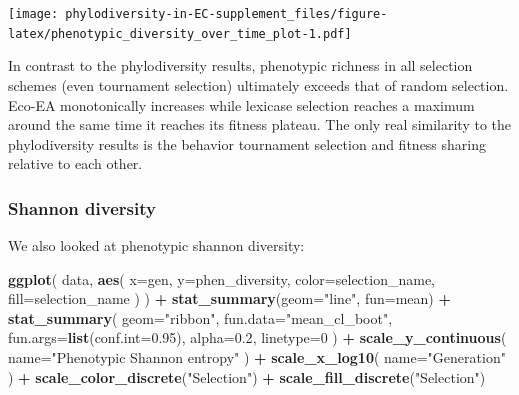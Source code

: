\documentclass[]{book}
\newenvironment{Shaded}{\begin{snugshade}}{\end{snugshade}}
\newcommand{\DataTypeTok}[1]{\textcolor[rgb]{0.13,0.29,0.53}{#1}}
\newcommand{\DecValTok}[1]{\textcolor[rgb]{0.00,0.00,0.81}{#1}}
\newcommand{\FloatTok}[1]{\textcolor[rgb]{0.00,0.00,0.81}{#1}}
\newcommand{\KeywordTok}[1]{\textcolor[rgb]{0.13,0.29,0.53}{\textbf{#1}}}
\newcommand{\NormalTok}[1]{#1}
\newcommand{\OperatorTok}[1]{\textcolor[rgb]{0.81,0.36,0.00}{\textbf{#1}}}
\newcommand{\StringTok}[1]{\textcolor[rgb]{0.31,0.60,0.02}{#1}}
\begin{document}
\texttt{[image: phylodiversity-in-EC-supplement\_files/figure-latex/phenotypic\_diversity\_over\_time\_plot-1.pdf]}

In contrast to the phylodiversity results, phenotypic richness in all selection schemes (even tournament selection) ultimately exceeds that of random selection. Eco-EA monotonically increases while lexicase selection reaches a maximum around the same time it reaches its fitness plateau. The only real similarity to the phylodiversity results is the behavior tournament selection and fitness sharing relative to each other.

\hypertarget{shannon-diversity}{%
\subsubsection{Shannon diversity}\label{shannon-diversity}}

We also looked at phenotypic shannon diversity:

\begin{Shaded}
\begin{Highlighting}[]
\KeywordTok{ggplot}\NormalTok{(}
\NormalTok{    data,}
    \KeywordTok{aes}\NormalTok{(}
      \DataTypeTok{x=}\NormalTok{gen,}
      \DataTypeTok{y=}\NormalTok{phen_diversity,}
      \DataTypeTok{color=}\NormalTok{selection_name,}
      \DataTypeTok{fill=}\NormalTok{selection_name}
\NormalTok{    )}
\NormalTok{  ) }\OperatorTok{+}
\StringTok{  }\KeywordTok{stat_summary}\NormalTok{(}\DataTypeTok{geom=}\StringTok{"line"}\NormalTok{, }\DataTypeTok{fun=}\NormalTok{mean) }\OperatorTok{+}
\StringTok{  }\KeywordTok{stat_summary}\NormalTok{(}
    \DataTypeTok{geom=}\StringTok{"ribbon"}\NormalTok{,}
    \DataTypeTok{fun.data=}\StringTok{"mean_cl_boot"}\NormalTok{,}
    \DataTypeTok{fun.args=}\KeywordTok{list}\NormalTok{(}\DataTypeTok{conf.int=}\FloatTok{0.95}\NormalTok{),}
    \DataTypeTok{alpha=}\FloatTok{0.2}\NormalTok{,}
    \DataTypeTok{linetype=}\DecValTok{0}
\NormalTok{  ) }\OperatorTok{+}
\StringTok{  }\KeywordTok{scale_y_continuous}\NormalTok{(}
    \DataTypeTok{name=}\StringTok{"Phenotypic Shannon entropy"}
\NormalTok{  ) }\OperatorTok{+}
\StringTok{  }\KeywordTok{scale_x_log10}\NormalTok{(}
    \DataTypeTok{name=}\StringTok{"Generation"}
\NormalTok{  ) }\OperatorTok{+}
\StringTok{  }\KeywordTok{scale_color_discrete}\NormalTok{(}\StringTok{"Selection"}\NormalTok{) }\OperatorTok{+}\StringTok{ }
\StringTok{  }\KeywordTok{scale_fill_discrete}\NormalTok{(}\StringTok{"Selection"}\NormalTok{)}
\end{Highlighting}
\end{Shaded}
\end{document}
